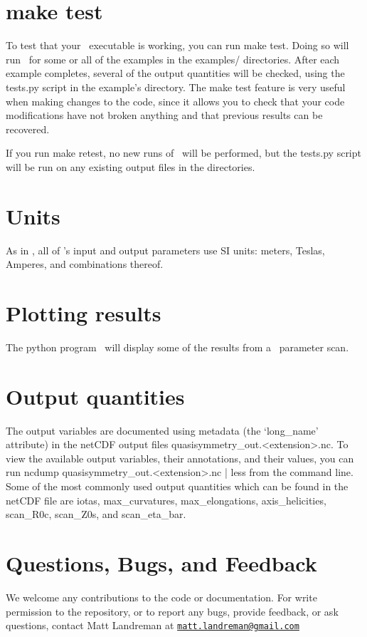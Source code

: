 \section{\ttfamily make test}

To test that your \quasisymmetry~executable is working, you can run {\ttfamily make test}.  Doing so will run
\quasisymmetry~for some or all of the examples in the {\ttfamily examples/} directories.
After each example completes, several of the output quantities
will be checked, using the
{\ttfamily tests.py} script in the example's directory.
The {\ttfamily make test} feature is very useful when making changes to the code, since it allows you to check
that your code modifications have not broken anything and that previous results
can be recovered.

If you run {\ttfamily make retest},
no new runs of \quasisymmetry~will be performed, but the {\ttfamily tests.py} script
will be run on any existing output files in the  directories.

\section{Units}

As in \vmec, all of \quasisymmetry's input and output parameters use SI units: meters, Teslas, Amperes, and combinations thereof.

\section{Plotting results}

The python program \quasisymmetryPlotScan~will display some of the results from a \quasisymmetry~parameter scan.

\section{Output quantities}

The output variables are documented using metadata (the `{\ttfamily long\_name}' attribute)
in the netCDF output files {\ttfamily quasisymmetry\_out.<extension>.nc}.
To view the available output variables, their annotations, and their values, you can run
{\ttfamily ncdump quasisymmetry\_out.<extension>.nc | less} from the command line.
Some of the most commonly used output quantities which can be found in the netCDF file are 
{\ttfamily iotas},
{\ttfamily max\_curvatures},
{\ttfamily max\_elongations},
{\ttfamily axis\_helicities},
{\ttfamily scan\_R0c},
{\ttfamily scan\_Z0s},
and
{\ttfamily scan\_eta\_bar}.

\section{Questions, Bugs, and Feedback}

We welcome any contributions to the code or documentation.
For write permission to the repository, or to report any bugs, provide feedback, or ask questions, contact Matt Landreman at
\href{mailto:matt.landreman@gmail.com}{\nolinkurl{matt.landreman@gmail.com} }






